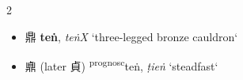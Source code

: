 \begin{multicols}{2}
\begin{itemize}






\end{itemize}


\medskip

    \begin{itemize}
    \item \begin{flushleft} {\Large{鼎}} 
    {\large{\textbf{teṅ}}}, \textit{teṅX}
    `three-legged bronze cauldron` \end{flushleft}

    \item \begin{flushleft}  {\Large{鼑}} (later {\Large{貞}})   %
      {\large{{\textsuperscript{prognosc}}teṅ}}, \textit{ṭieṅ}
    `steadfast` \end{flushleft}


\end{itemize}
\end{multicols}
